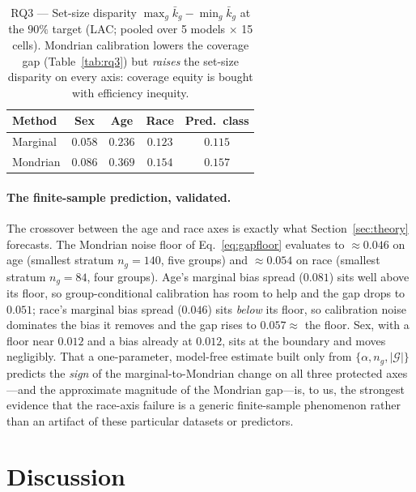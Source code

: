 \documentclass[review,12pt]{elsarticle}
\begin{document}
\begin{table}[t]
\centering
\caption{RQ3 --- Set-size disparity $\max_g \bar k_g - \min_g \bar k_g$ at the $90\%$ target (LAC; pooled over 5 models $\times$ 15 cells). Mondrian calibration lowers the coverage gap (Table~\ref{tab:rq3}) but \emph{raises} the set-size disparity on every axis: coverage equity is bought with efficiency inequity.}
\label{tab:tax}
\small
\begin{tabular}{lcccc}
\toprule
Method & Sex & Age & Race & Pred.\ class \\
\midrule
Marginal & $0.058$ & $0.236$ & $0.123$ & $0.115$ \\
Mondrian & $0.086$ & $0.369$ & $0.154$ & $0.157$ \\
\bottomrule
\end{tabular}
\end{table}

\paragraph{The finite-sample prediction, validated.}
The crossover between the age and race axes is exactly what Section~\ref{sec:theory} forecasts. The Mondrian noise floor of Eq.~\eqref{eq:gapfloor} evaluates to $\approx 0.046$ on age (smallest stratum $n_g=140$, five groups) and $\approx 0.054$ on race (smallest stratum $n_g=84$, four groups). Age's marginal bias spread ($0.081$) sits well above its floor, so group-conditional calibration has room to help and the gap drops to $0.051$; race's marginal bias spread ($0.046$) sits \emph{below} its floor, so calibration noise dominates the bias it removes and the gap rises to $0.057\approx$ the floor. Sex, with a floor near $0.012$ and a bias already at $0.012$, sits at the boundary and moves negligibly. That a one-parameter, model-free estimate built only from $\{\alpha, n_g, |\mathcal{G}|\}$ predicts the \emph{sign} of the marginal-to-Mondrian change on all three protected axes---and the approximate magnitude of the Mondrian gap---is, to us, the strongest evidence that the race-axis failure is a generic finite-sample phenomenon rather than an artifact of these particular datasets or predictors.

\section{Discussion}
\label{sec:discussion}
\end{document}
